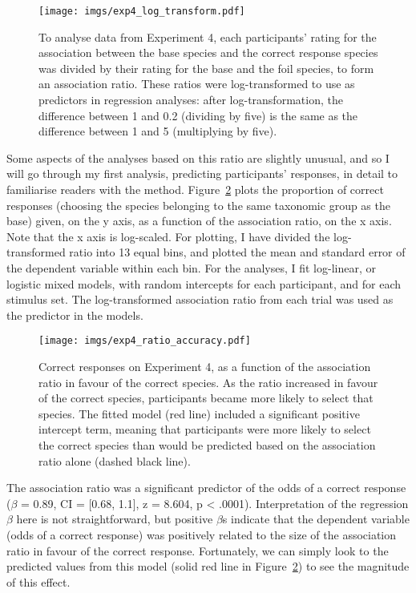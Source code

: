 \begin{figure}[h]
  \centering
  \texttt{[image: imgs/exp4\_log\_transform.pdf]}
  \caption[The log-transformed association ratio, used as a predictor in Experiment 4.]{
    To analyse data from Experiment 4,
    each participants' rating for the association between
    the base species and the correct response species
    was divided by their rating for
    the base and the foil species, to form an association ratio.
    These ratios were log-transformed to use as predictors in regression analyses:
    after log-transformation, the difference between 1 and 0.2 (dividing by five)
    is the same as the difference between 1 and 5 (multiplying by five).
    \label{fig:exp4_log_transform}
  }
\end{figure}

Some aspects of the analyses based on this ratio are slightly unusual,
and so I will go through my first analysis,
predicting participants' responses,
in detail to familiarise readers with the method.
Figure~\ref{fig:exp4_ratio_accuracy} plots the proportion of correct responses 
(choosing the species belonging to the same taxonomic group as the base) given, on the y axis,
as a function of the association ratio, on the x axis.
Note that the x axis is log-scaled.
For plotting, I have divided the log-transformed ratio into 13 equal bins,
and plotted the mean and standard error of the dependent variable within each bin.
For the analyses, I fit log-linear, or logistic mixed models,
with random intercepts for each participant, and for each stimulus set.
The log-transformed association ratio from each trial was used as the predictor in the models.

\begin{figure}[h]
  \centering
  \texttt{[image: imgs/exp4\_ratio\_accuracy.pdf]}
  \caption[Effect of the association ratio of participants' accuracy, Experiment 4.]{
    Correct responses on Experiment 4, as a function of
    the association ratio in favour of the correct species.
    As the ratio increased in favour of the correct species,
    participants became more likely to select that species.
    The fitted model (red line) included a significant positive intercept term,
    meaning that participants were more likely to select the correct species
    than would be predicted based on the association ratio alone (dashed black line).
    \label{fig:exp4_ratio_accuracy}
  }
\end{figure}

The association ratio was a significant predictor of the odds of a correct response
($\beta$ = 0.89, CI = [0.68, 1.1], z = 8.604, p < .0001).
Interpretation of the regression $\beta$ here is not straightforward,
but positive $\beta$s indicate that the dependent variable
(odds of a correct response) was positively related to
the size of the association ratio in favour of the correct response.
Fortunately, we can simply look to the predicted values from this model
(solid red line in Figure~\ref{fig:exp4_ratio_accuracy})
to see the magnitude of this effect.

